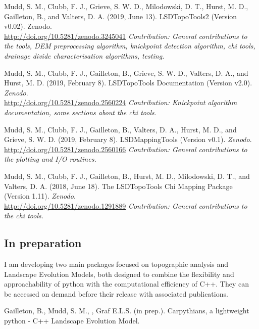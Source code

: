 \documentclass[10pt, a4paper]{article}
\newcommand{\years}[1]{\marginnote{\scriptsize #1}}
\begin{document}
Mudd, S. M., Clubb, F. J., Grieve, S. W. D., Milodowski, D. T., Hurst, M. D., Gailleton, B., and Valters, D. A. (2019, June 13). LSDTopoTools2 (Version v0.02). Zenodo.\\ \href{http://doi.org/10.5281/zenodo.3245041}{http://doi.org/10.5281/zenodo.3245041} \textit{Contribution: General contributions to the tools, DEM preprocessing algorithm, knickpoint detection algorithm, chi tools, drainage divide characterisation algorithms, testing.}\par

Mudd, S. M., Clubb, F. J., Gailleton, B., Grieve, S. W. D., Valters, D. A., and Hurst, M. D. (2019, February 8). LSDTopoTools Documentation (Version v2.0). \textit{Zenodo}.\\ \href{http://doi.org/10.5281/zenodo.2560224}{http://doi.org/10.5281/zenodo.2560224} \textit{Contribution: Knickpoint algorithm documentation, some sections about the chi tools.}\par

Mudd, S. M., Clubb, F. J., Gailleton, B., Valters, D. A., Hurst, M. D., and Grieve, S. W. D. (2019, February 8). LSDMappingTools (Version v0.1). \textit{Zenodo}.\\ \href{http://doi.org/10.5281/zenodo.2560166}{http://doi.org/10.5281/zenodo.2560166} \textit{Contribution: General contributions to the plotting and I/O routines.}\par 

Mudd, S. M., Clubb, F. J., Gailleton, B., Hurst, M. D., Milodowski, D. T., and Valters, D. A. (2018, June 18). The LSDTopoTools Chi Mapping Package (Version 1.11). \textit{Zenodo}.\\ \href{http://doi.org/10.5281/zenodo.1291889}{http://doi.org/10.5281/zenodo.1291889} \textit{Contribution: General contributions to the chi tools.}\par

\subsection*{In preparation}

\years{In preparation} I am developing two main packages focused on topographic analysis and Landscape Evolution Models, both designed to combine the flexibility and approachability of python with the computational efficiency  of C++. They can be accessed on demand before their release with associated publications.\par

Gailleton, B., Mudd, S. M., , Graf E.L.S. (in prep.). Carpythians, a lightweight python - C++ Landscape Evolution Model.\par
\end{document}
